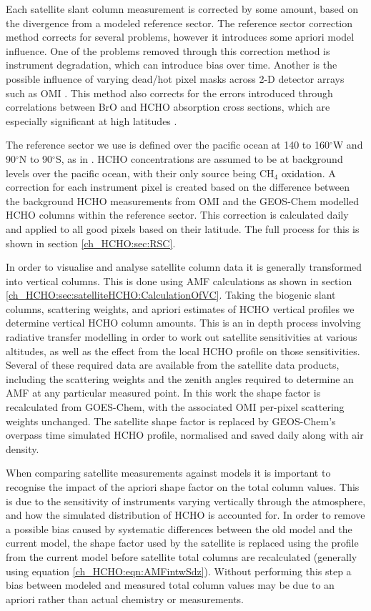     Each satellite slant column measurement is corrected by some amount, based on the divergence from a modeled reference sector.
    The reference sector correction method corrects for several problems, however it introduces some apriori model influence.
    One of the problems removed through this correction method is instrument degradation, which can introduce bias over time.
    Another is the possible influence of varying dead/hot pixel masks across 2-D detector arrays such as OMI \citep{DeSmedt2015}.
    This method also corrects for the errors introduced through correlations between BrO and HCHO absorption cross sections, which are especially significant at high latitudes \citep{Abad2015}.
    
    The reference sector we use is defined over the pacific ocean at 140 to 160$^{\circ}$W and 90$^{\circ}$N to 90$^{\circ}$S, as in \citet{Abad2015}.
    HCHO concentrations are assumed to be at background levels over the pacific ocean, with their only source being CH$_4$ oxidation.
    A correction for each instrument pixel is created based on the difference between the background HCHO measurements from OMI and the GEOS-Chem modelled HCHO columns within the reference sector.
    This correction is calculated daily and applied to all good pixels based on their latitude.
    The full process for this is shown in section \ref{ch_HCHO:sec:RSC}.
    
    In order to visualise and analyse satellite column data it is generally transformed into vertical columns. 
    This is done using AMF calculations as shown in section \ref{ch_HCHO:sec:satelliteHCHO:CalculationOfVC}.
    Taking the biogenic slant columns, scattering weights, and apriori estimates of HCHO vertical profiles we determine vertical HCHO column amounts.
    This is an in depth process involving radiative transfer modelling in order to work out satellite sensitivities at various altitudes, as well as the effect from the local HCHO profile on those sensitivities.
    Several of these required data are available from the satellite data products, including the scattering weights and the zenith angles required to determine an AMF at any particular measured point.
    In this work the shape factor is recalculated from GOES-Chem, with the associated OMI per-pixel scattering weights unchanged. 
    The satellite shape factor is replaced by GEOS-Chem's overpass time simulated HCHO profile, normalised and saved daily along with air density.
    
    When comparing satellite measurements against models it is important to recognise the impact of the apriori shape factor on the total column values.
    This is due to the sensitivity of instruments varying vertically through the atmosphere, and how the simulated distribution of HCHO is accounted for.
    In order to remove a possible bias caused by systematic differences between the old model and the current model, the shape factor used by the satellite is replaced using the profile from the current model before satellite total columns are recalculated (generally using equation \ref{ch_HCHO:eqn:AMFintwSdz}).
    Without performing this step a bias between modeled and measured total column values may be due to an apriori rather than actual chemistry or measurements.

